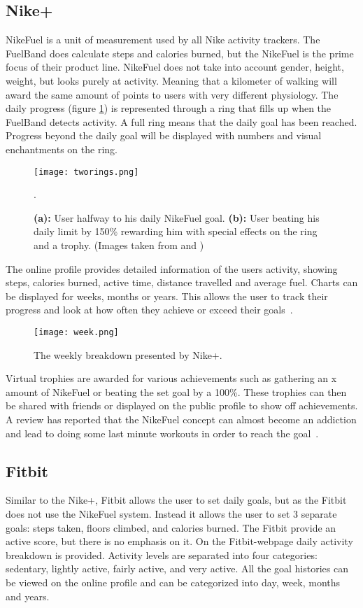 \subsection{Nike+}
NikeFuel \cite{nikefuel} is a unit of measurement used by all Nike activity trackers. The FuelBand does calculate steps and calories burned, but the NikeFuel is the prime focus of their product line. NikeFuel does not take into account gender, height, weight, but looks purely at activity. Meaning that a kilometer of walking will award the same amount of points to users with very different physiology. The daily progress (figure \ref{fig:tworings}) is represented through a ring that fills up when the FuelBand detects activity. A full ring means that the daily goal has been reached. Progress beyond the daily goal will be displayed with numbers and visual enchantments on the ring. 

\begin{figure}[h!]
	\centering
		\texttt{[image: tworings.png]}
		\caption{\footnotesize \textbf{(a):} User halfway to his daily NikeFuel goal. \textbf{(b):} User beating his daily limit by 150\% rewarding him with special effects on the ring and a trophy. (Images taken from \cite{fuelbandDcRain} and \cite{fuelbandTechSpce})}.
		\label{fig:tworings}
\end{figure}

The online profile provides detailed information of the users activity, showing steps, calories burned, active time, distance travelled and average fuel. Charts can be displayed for weeks, months or years. This allows the user to track their progress and look at how often they achieve or exceed their goals~\cite{fuelbandTechSpce}. 

\begin{figure}[h!]
	\centering
		\texttt{[image: week.png]}
		\caption{\footnotesize The weekly breakdown presented by Nike+. \cite{fuelbandTechSpce}}
		\label{fig:activityBreakdown}
\end{figure}

Virtual trophies are awarded for various achievements such as gathering an x amount of NikeFuel or beating the set goal by a 100\%. These trophies can then be shared with friends or displayed on the public profile to show off achievements. A review has reported that the NikeFuel concept can almost become an addiction and lead to doing some last minute workouts in order to reach the goal~\cite{fuelbandDcRain}.

\subsection{Fitbit}
Similar to the Nike+, Fitbit \cite{fitBit} allows the user to set daily goals, but as the Fitbit does not use the NikeFuel system. Instead it allows the user to set 3 separate goals: steps taken, floors climbed, and calories burned. The Fitbit provide an active score, but there is no emphasis on it. On the Fitbit-webpage daily activity breakdown is provided. Activity levels are separated into four categories: sedentary, lightly active, fairly active, and very active. All the goal histories can be viewed on the online profile and can be categorized into day, week, months and years. 

